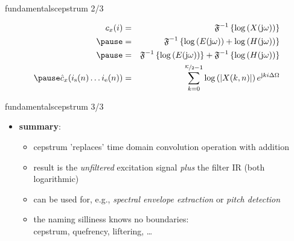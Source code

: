 		\begin{frame}{fundamentals}{cepstrum 2/3}
			\vspace{-6mm}
            \begin{footnotesize}
            \begin{eqnarray*}
				c_x(i)	&=& \mathfrak{F}^{-1}\left\{\log\left(X(\jom)\right)\right\}\nonumber\\
                        \pause
						&=& \mathfrak{F}^{-1}\left\{\log\left(E(\jom)\right) + \log\left(H(\jom)\right)\right\}\nonumber\\
						\pause
                        &=& \mathfrak{F}^{-1}\left\{\log\left(E(\jom)\right)\right\} + \mathfrak{F}^{-1}\left\{\log\left(H(\jom)\right)\right\} \\
                    \pause
					\hat{c}_x(i_{\mathrm{s}}(n)\ldots i_{\mathrm{e}}(n)) &=& \sum\limits_{k=0}^{\nicefrac{\mathcal{K}}{2}-1}{\log\left(|X(k,n)|\right)\e^{\mathrm{j}ki\Delta\Omega}} 
			\end{eqnarray*}
			\end{footnotesize}	
			\vspace{-4mm}
		\end{frame}
        
        \begin{frame}{fundamentals}{cepstrum 3/3}
            \begin{itemize}
                \item \textbf{summary}:
                    \begin{itemize}
                        \item   cepstrum 'replaces' time domain convolution operation with addition
                        \item   result is the \textit{unfiltered} excitation signal \textit{plus} the filter IR (both logarithmic)
                        \item   can be used for, e.g., \textit{spectral envelope extraction} or \textit{pitch detection}
                        \bigskip
                        \item<2> the naming silliness knows no boundaries:\\
                         cepstrum, quefrency, liftering, \ldots
                    \end{itemize}
            \end{itemize}
        \end{frame}

